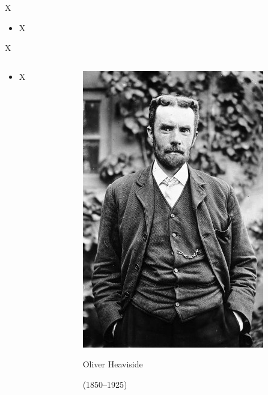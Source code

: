 \documentclass[urlcolor=blue,dvipsnames]{beamer}
\begin{document}
\begin{frame}{X}

\begin{itemize}
\item X
\end{itemize}
\end{frame}


\begin{frame}{X}

\begin{columns}
\begin{column}{0.77\textwidth}
\begin{itemize}
\item X
\end{itemize}
\end{column}
\begin{column}{0.23\textwidth}
\vspace{3mm}

\includegraphics[width=\textwidth]{figs/Heaviside}

\tiny
Oliver Heaviside

(1850--1925)
\end{column}
\end{columns}
\end{frame}
\end{document}
